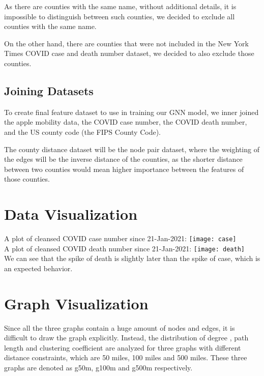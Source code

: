 As there are counties with the same name, without additional details, it is impossible to distinguish between such counties, we decided to exclude all counties with the same name.

On the other hand, there are counties that were not included in the New York Times COVID case and death number dataset, we decided to also exclude those counties.

\subsection{Joining Datasets}

To create final feature dataset to use in training our GNN model, we inner joined the apple mobility data, the COVID case number, the COVID death number, and the US county code (the FIPS County Code). 

The county distance dataset will be the node pair dataset, where the weighting of the edges will be the inverse distance of the counties, as the shorter distance between two counties would mean higher importance between the features of those counties.


\section{Data Visualization}

A plot of cleansed COVID case number since 21-Jan-2021:
\texttt{[image: case]}\\

A plot of cleansed COVID death number since 21-Jan-2021:
\texttt{[image: death]}\\

We can see that the spike of death is slightly later than the spike of case, which is an expected behavior.

\section{Graph Visualization}
Since all the three graphs contain a huge amount of nodes and edges, it is difficult to draw the graph explicitly. Instead, the distribution of degree , path length and clustering coefficient are analyzed for three graphs with different distance constraints, which are 50 miles, 100 miles and 500 miles. These three graphs are denoted as g50m, g100m and g500m respectively. 

